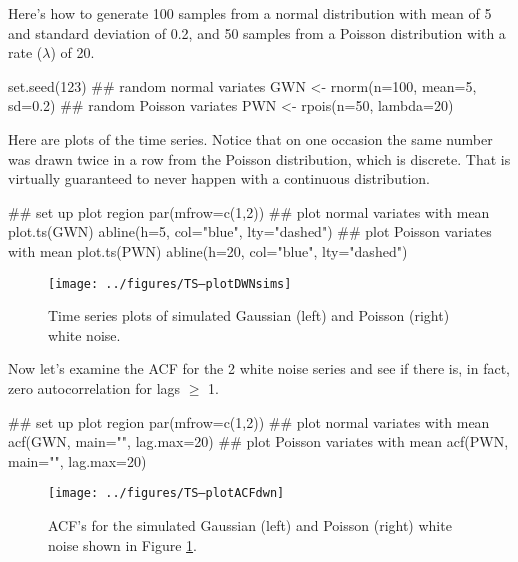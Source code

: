 Here's how to generate 100 samples from a normal distribution with mean of 5 and standard deviation of 0.2, and 50 samples from a Poisson distribution with a rate ($\lambda$) of 20.

\begin{Schunk}
\begin{Sinput}
 set.seed(123)
 ## random normal variates
 GWN <- rnorm(n=100, mean=5, sd=0.2)
 ## random Poisson variates
 PWN <- rpois(n=50, lambda=20)
\end{Sinput}
\end{Schunk}

Here are plots of the time series.  Notice that on one occasion the same number was drawn twice in a row from the Poisson distribution, which is discrete.  That is virtually guaranteed to never happen with a continuous distribution.

\begin{Schunk}
\begin{Sinput}
 ## set up plot region
 par(mfrow=c(1,2))
 ## plot normal variates with mean
 plot.ts(GWN)
 abline(h=5, col="blue", lty="dashed")
 ## plot Poisson variates with mean
 plot.ts(PWN)
 abline(h=20, col="blue", lty="dashed")
\end{Sinput}
\end{Schunk}

\begin{figure}[htp]
\begin{center}
\texttt{[image: ../figures/TS--plotDWNsims]}
  \end{center}
\caption{Time series plots of simulated Gaussian (left) and Poisson (right) white noise.}
\label{fig:LW1.WNexTS}
\end{figure}

Now let's examine the ACF for the 2 white noise series and see if there is, in fact, zero autocorrelation for lags $\geq$ 1.

\begin{Schunk}
\begin{Sinput}
 ## set up plot region
 par(mfrow=c(1,2))
 ## plot normal variates with mean
 acf(GWN, main="", lag.max=20)
 ## plot Poisson variates with mean
 acf(PWN, main="", lag.max=20)
\end{Sinput}
\end{Schunk}

\begin{figure}[htp]
\begin{center}
\texttt{[image: ../figures/TS--plotACFdwn]}
\end{center}
\caption{ACF's for the simulated Gaussian (left) and Poisson (right) white noise shown in Figure \ref{fig:LW1.WNexTS}.}
\label{fig:LW1.WNexACF}
\end{figure}


